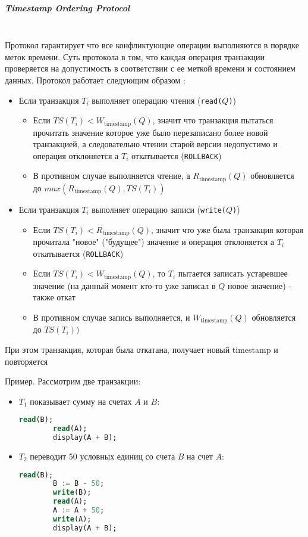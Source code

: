 \subparagraph{Timestamp Ordering Protocol} ~\\

Протокол гарантирует что все конфликтующие операции выполняются в порядке меток времени. Суть протокола в том, что каждая операция транзакции проверяется на допустимость в соответствии с ее меткой времени и состоянием данных. Протокол работает следующим образом \autocite{Silberschatz}:

\begin{itemize}
    \item Если транзакция $T_i$ выполняет операцию чтения (\texttt{read($Q$)})
    \begin{itemize}
        \item Если $TS(T_i) < W_{\text{timestamp}}(Q)$, значит что транзакция пытаться прочитать значение которое уже было перезаписано более новой транзакцией, а следовательно чтении старой версии недопустимо и операция отклоняется а $T_i$ откатывается (\texttt{ROLLBACK})
        \item В противном случае выполняется чтение, а $R_{\text{timestamp}}(Q)$ обновляется до $max(R_{\text{timestamp}}(Q), TS(T_i))$
    \end{itemize}

    \item Если транзакция $T_i$ выполняет операцию записи (\texttt{write($Q$)})
    \begin{itemize}
        \item Если $TS(T_i) < R_{\text{timestamp}}(Q)$, значит что уже была транзакция которая прочитала "новое" ("будущее") значение и операция отклоняется а $T_i$ откатывается (\texttt{ROLLBACK})
        \item Если $TS(T_i) < W_{\text{timestamp}}(Q)$, то $T_i$ пытается записать устаревшее значение (на данный момент кто-то уже записал в $Q$ новое значение) - также откат
        \item В противном случае запись выполняется, и $W_{\text{timestamp}}(Q)$ обновляется до $TS(T_i))$ 
    \end{itemize}
\end{itemize}

При этом транзакция, которая была откатана, получает новый timestamp и повторяется

Пример. Рассмотрим две транзакции:
\begin{itemize}
    \item $T_1$ показывает сумму на счетах $A$ и $B$:
    \begin{lstlisting}[language=SQL]
        read(B);
        read(A);
        display(A + B);           
    \end{lstlisting}

    \item $T_2$ переводит 50 условных единиц со счета $B$ на счет $A$:
    \begin{lstlisting}[language=SQL]
        read(B);
        B := B - 50;
        write(B);
        read(A);
        A := A + 50;
        write(A);
        display(A + B);               
    \end{lstlisting}
\end{itemize}

